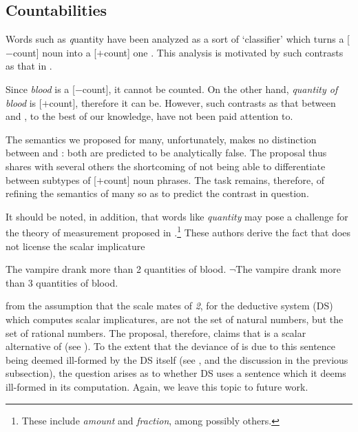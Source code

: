 \documentclass[output=paper]{langscibook}
\begin{document}
\subsection{Countabilities} \label{hai-tri:sec:countabilities}

Words such as {\textit quantity} have been analyzed as a sort of `classifier' which turns a [$-$count] noun into a [$+$count] one \citep[cf.][]{Chierchia:2010}. This analysis is motivated by such contrasts as that in . 

\ea \label{hai-tri:vampire}
\label{hai-tri:bloods}
\label{hai-tri:quantitiesofblood}
\z
\z

\noindent Since \textit{blood} is a [$-$count], it cannot be counted. On the other hand, \textit{quantity of blood} is [$+$count], therefore it can be. However, such contrasts as that between  and , to the best of our knowledge, have not been paid attention to.

\label{hai-tri:2.3}
\z

\noindent The semantics we proposed for {\sc many}, unfortunately, makes no distinction between  and : both are predicted to be analytically false. The proposal thus shares with several others the shortcoming of not being able to differentiate between subtypes of [$+$count] noun phrases. The task remains, therefore, of refining the semantics of {\sc many} so as to predict the contrast in question.

It should be noted, in addition, that words like \textit{quantity} may pose a challenge for the theory of measurement proposed in \citet{foxhackl2006universal}.\footnote{These include \textit{amount} and \textit{fraction}, among possibly others.

\ea
{}
\z
\z
} These authors derive the fact that  does not license the scalar implicature  

\ea
\ea The vampire drank more than 2 quantities of blood.
\label{hai-tri:morethan2}
\ex $\neg$The vampire drank more than 3 quantities of blood.
\label{hai-tri:morethan3}
\z
\z

\noindent from the assumption that the scale mates of \textit{2}, for the deductive system (DS) which computes scalar implicatures, are not the set of natural numbers, but the set of rational numbers. The proposal, therefore, claims that  is a scalar alternative of  (see ). To the extent that the deviance of  is due to this sentence being deemed ill-formed by the DS itself (see \citealt{gajewski2003analyticity, foxhackl2006universal}, and the discussion in the previous subsection), the question arises as to whether DS uses a sentence which it deems ill-formed in its computation. Again, we leave this topic to future work. %
\end{document}

